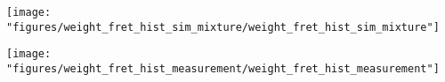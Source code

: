 
\renewcommand{\thesubsection}{S6 Appendix.}
\renewcommand{\thesubsubsection}{S6.\arabic{subsubsection}}

%
%
%
%
%


\begin{figure*}
\begin{center}
\texttt{[image: "figures/weight\_fret\_hist\_sim\_mixture/weight\_fret\_hist\_sim\_mixture"]}
\caption[]{}
\end{center}
\end{figure*}

\begin{figure*}
\begin{center}
\texttt{[image: "figures/weight\_fret\_hist\_measurement/weight\_fret\_hist\_measurement"]}
\caption[]{}
\end{center}
\end{figure*}




